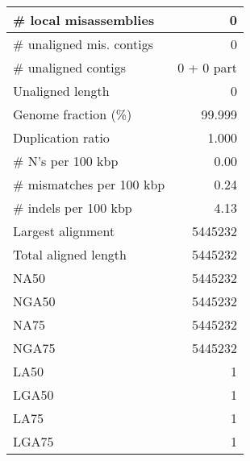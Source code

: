 \documentclass[12pt,a4paper]{article}
\begin{document}
\begin{table}[ht]
\begin{center}
\begin{tabular}{|l*{1}{|r}|}
\# local misassemblies & 0 \\ \hline
\# unaligned mis. contigs & 0 \\ \hline
\# unaligned contigs & 0 + 0 part \\ \hline
Unaligned length & 0 \\ \hline
Genome fraction (\%) & 99.999 \\ \hline
Duplication ratio & 1.000 \\ \hline
\# N's per 100 kbp & 0.00 \\ \hline
\# mismatches per 100 kbp & 0.24 \\ \hline
\# indels per 100 kbp & 4.13 \\ \hline
Largest alignment & 5445232 \\ \hline
Total aligned length & 5445232 \\ \hline
NA50 & 5445232 \\ \hline
NGA50 & 5445232 \\ \hline
NA75 & 5445232 \\ \hline
NGA75 & 5445232 \\ \hline
LA50 & 1 \\ \hline
LGA50 & 1 \\ \hline
LA75 & 1 \\ \hline
LGA75 & 1 \\ \hline
\end{tabular}
\end{center}
\end{table}
\end{document}
